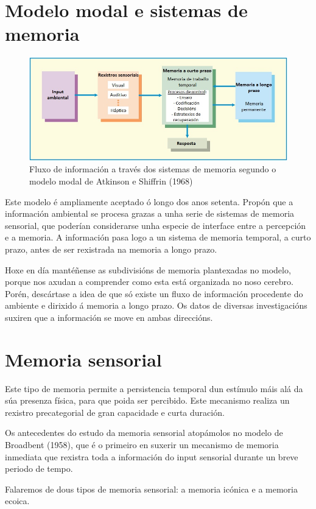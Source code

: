 \documentclass[a4paper,11pt]{article}
\begin{document}
\section{Modelo modal e sistemas de memoria}
\begin{figure}[h!]
	\centering
	\includegraphics[width=0.95\linewidth]{memoria1_2}
	\caption{Fluxo de información a través dos sistemas de memoria segundo o modelo modal de Atkinson 	e Shiffrin (1968)}
\end{figure}

Este modelo é ampliamente aceptado ó longo dos anos setenta. Propón que a información ambiental se procesa grazas a unha serie de sistemas de memoria sensorial, que poderían considerarse unha especie de interface entre a percepción e a memoria. A información pasa logo a un sistema de memoria temporal, a curto prazo, antes de ser rexistrada na memoria a longo prazo.

Hoxe en día mantéñense as subdivisións de memoria plantexadas no modelo, porque nos axudan a comprender como esta está organizada no noso cerebro. Porén, descártase a idea de que só existe un fluxo de información procedente do ambiente e dirixido á memoria a longo prazo. Os datos de diversas investigacións suxiren que a información se move en ambas direccións. 

\section{Memoria sensorial}
Este tipo de memoria permite a persistencia temporal dun estímulo máis alá da súa presenza física, para que poida ser percibido. Este mecanismo realiza un rexistro precategorial de gran capacidade e curta duración.

Os antecedentes do estudo da memoria sensorial atopámolos no modelo de Broadbent (1958), que é o primeiro en suxerir un mecanismo de memoria inmediata que rexistra toda a información do input sensorial durante un breve periodo de tempo.

Falaremos de dous tipos de memoria sensorial: a memoria icónica e a memoria ecoica.
\end{document}
